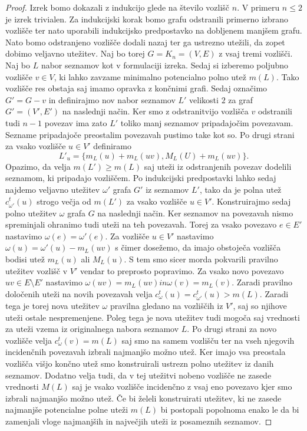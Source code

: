 \documentclass[12pt,a4paper,twoside]{article}
\theoremstyle{definition} %
\theoremstyle{plain} %
\numberwithin{equation}{section}  %
\begin{document}
\begin{proof}
Izrek bomo dokazali z indukcijo glede na število vozlišč $n$. V primeru $n \le 2$ je izrek trivialen. Za indukcijski korak bomo grafu odstranili primerno izbrano vozlišče ter nato uporabili indukcijsko predpostavko na dobljenem manjšem grafu. Nato bomo odstranjeno vozlišče dodali nazaj ter ga ustrezno utežili, da zopet dobimo veljavno utežitev. Naj bo torej $G = K_n = (V, E)$ z vsaj tremi vozlišči. Naj bo $L$ nabor seznamov kot v formulaciji izreka. Sedaj si izberemo poljubno vozlišče $v \in V$, ki lahko zavzame minimalno potencialno polno utež $m(L)$. Tako vozlišče res obstaja saj imamo opravka z končnimi grafi. Sedaj označimo $G' = G - v$ in definirajmo nov nabor seznamov $L'$ velikosti $2$ za graf $G' = (V', E')$ na naslednji način. Ker smo z odstranitvijo vozlišča $v$ odstranili tudi $n-1$ povezav ima zato $L'$ toliko manj seznamov pripadajočim povezavam. Sezname pripadajoče preostalim povezavah pustimo take kot so. Po drugi strani za vsako vozlišče $u \in V'$ definiramo 
$$L'_u = \{m_L(u) + m_L(uv), M_L(U) + m_L(uv) \}. $$
Opazimo, da velja $m(L') \ge m(L)$ saj uteži iz odstranjenih povezav dodelili seznamom, ki pripadajo vozliščem. Po indukcijski predpostavki lahko sedaj najdemo veljavno utežitev $\omega'$ grafa $G'$ iz seznamov $L'$, tako da je polna utež $c_{\omega'}^t(u)$ strogo večja od $m(L')$ za vsako vozlišče $u \in V'$. Konstruirajmo sedaj polno utežitev $\omega$ grafa $G$ na naslednji način. Ker seznamov na povezavah nismo spreminjali ohranimo tudi uteži na teh povezavah. Torej za vsako povezavo $e \in E'$ nastavimo $\omega(e) = \omega'(e)$. Za vozlišče $u \in V'$ nastavimo $\omega(u) = \omega'(u) - m_L(uv)$ s čimer dosežemo, da imajo obstoječa vozlišča bodisi utež $m_L(u)$ ali $M_L(u)$. S tem smo sicer morda pokvarili pravilno utežitev vozlišč v $V'$ vendar to preprosto popravimo. Za vsako novo povezavo $uv \in E \setminus E'$ nastavimo $\omega(uv) = m_L(uv) in \omega(v)= m_L(v)$. Zaradi pravilno določenih uteži na novih povezavah velja $c_{\omega}^t(u) =c_{\omega'}^t(u) > m(L)$. Zaradi tega je torej nova utežitev $\omega$ pravilna gledano na vozliščih iz $V'$, saj so njihove uteži ostale nespremenjene. Poleg tega je nova utežitev tudi mogoča saj vrednosti za uteži vzema iz originalnega nabora seznamov $L$. Po drugi strani za novo vozlišče velja $c_{\omega}^t(v) = m(L)$ saj smo na samem vozlišču ter na vseh njegovih incidenčnih povezavah izbrali najmanjšo možno utež. Ker imajo vsa preostala vozlišča višjo končno utež smo konstruirali ustrezn polno utežitev iz danih seznamov. Dodatno velja tudi, da v tej utežitvi nobeno vozlišče ne zasede vrednosti $M(L)$ saj je vsako vozlišče incidenčno z vsaj eno povezavo kjer smo izbrali najmanjšo možno utež.
Če bi želeli konstruirati utežitev, ki ne zasede najmanjše potencialne polne uteži $m(L)$ bi postopali popolnoma enako le da bi zamenjali vloge najmanjših in največjih uteži iz posameznih seznamov.
\end{proof}
\end{document}

